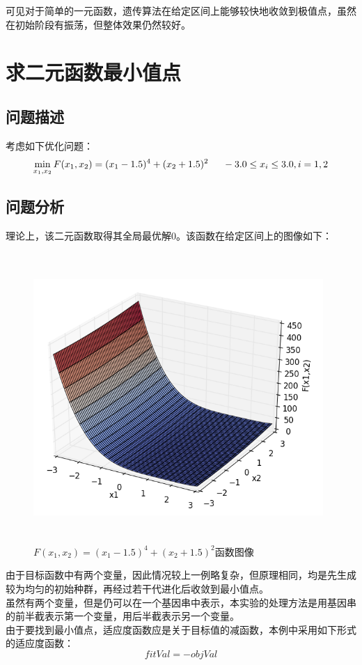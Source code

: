 \documentclass[UTF8]{ctexart}
\begin{document}
\indent 可见对于简单的一元函数，遗传算法在给定区间上能够较快地收敛到极值点，虽然在初始阶段有振荡，但整体效果仍然较好。

\section{求二元函数最小值点}

\subsection{问题描述}
考虑如下优化问题：
\begin{equation}
	\min_{x_1,x_2} F(x_1,x_2) = (x_1-1.5)^4+(x_2+1.5)^2 \indent -3.0 \leq x_i \leq 3.0,i=1,2 
\end{equation}

\subsection{问题分析}
理论上，该二元函数取得其全局最优解0。该函数在给定区间上的图像如下：
\begin{figure}[htbp]\centering
\includegraphics [width=11cm,height=11cm]{../pic/T1-2_func.png} 
\caption{$F(x_1,x_2) = (x_1-1.5)^4+(x_2+1.5)^2$函数图像}
\end{figure}

\indent 由于目标函数中有两个变量，因此情况较上一例略复杂，但原理相同，均是先生成较为均匀的初始种群，再经过若干代进化后收敛到最小值点。\\
\indent 虽然有两个变量，但是仍可以在一个基因串中表示，本实验的处理方法是用基因串的前半截表示第一个变量，用后半截表示另一个变量。\\
\indent 由于要找到最小值点，适应度函数应是关于目标值的减函数，本例中采用如下形式的适应度函数：
\begin{equation}
	fitVal=-objVal
\end{equation}
\end{document}
